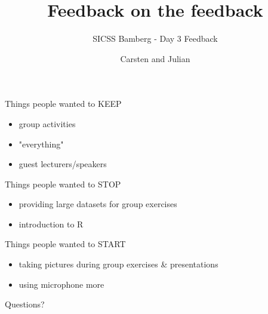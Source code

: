 \documentclass{beamer}
\title{Feedback on the feedback}
\subtitle{SICSS Bamberg - Day 3 Feedback}
\author{Carsten and Julian}
\institute{}
\date{}
\begin{document}
	\maketitle
	
	
	
	
	\begin{frame}
	
	Things people wanted to KEEP
	
	\begin{itemize}
		\item group activities
		\item "everything"
		\item guest lecturers/speakers
	\end{itemize}
	
\end{frame}

\begin{frame}
Things people wanted to STOP

\begin{itemize}
	\item providing large datasets for group exercises
	\item introduction to R
\end{itemize}

\end{frame}
\begin{frame}
Things people wanted to START

\begin{itemize}
\item taking pictures during group exercises \& presentations
\item using microphone more
\end{itemize}

\end{frame}


\begin{frame}[standout]

\begin{center}
\LARGE
Questions?
\end{center}

\end{frame}
\end{document}
